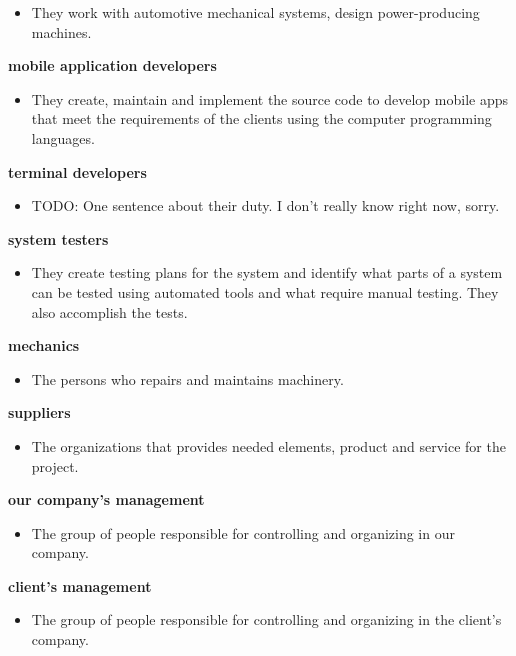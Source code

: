 \documentclass[a4paper]{article}
\begin{document}
\begin{list}{-}
		\begin{itemize}
			\item They work with automotive mechanical systems, design power-producing machines.
		\end{itemize}
	\item \textbf{mobile application developers}
		\begin{itemize}
			\item They create, maintain and implement the source code to develop mobile apps that meet the requirements of the clients using the computer programming languages.
		\end{itemize}
	\item \textbf{terminal developers}
		\begin{itemize}
			\item TODO: One sentence about their duty. I don't really know right now, sorry. 
		\end{itemize}
	\item \textbf{system testers}
		\begin{itemize}
			\item They create testing plans for the system and identify what parts of a system can be tested using automated tools and what require manual testing. They also accomplish the tests.
		\end{itemize}
	\item \textbf{mechanics}
		\begin{itemize}
			\item The persons who repairs and maintains machinery.
		\end{itemize}
	\item \textbf{suppliers}
		\begin{itemize}
			\item The organizations that provides needed elements, product and service for the project.
		\end{itemize}
	\item \textbf{our company’s management}
		\begin{itemize}
			\item The group of people responsible for controlling and organizing in our company.
		\end{itemize}
	\item \textbf{client's management}
		\begin{itemize}
			\item The group of people responsible for controlling and organizing in the client's company.
		\end{itemize}	
\end{list}
\end{document}
